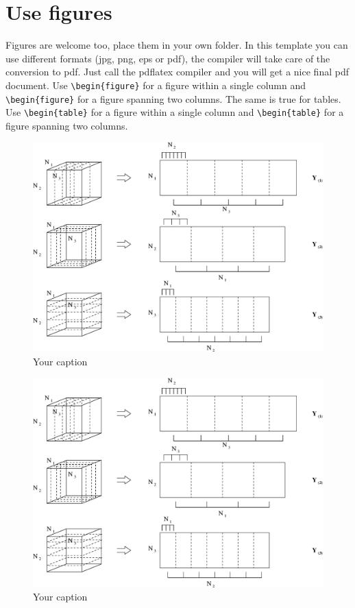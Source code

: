 \section{Use figures}

Figures are welcome too, place them in your own folder. In this template you can use different formats (jpg, png, eps or pdf), the compiler will take care of the conversion to pdf. Just call the pdflatex compiler and you will get a nice final pdf document. Use \verb"\begin{figure}" for a figure within a single column and \verb"\begin{figure}" for a figure spanning two columns.  The same is true for tables.  Use \verb"\begin{table}" for a figure within a single column and \verb"\begin{table}" for a figure spanning two columns.
%

%
\begin{figure}[htb]
\begin{center}
\includegraphics[width=0.7\linewidth,angle=0]{your_chapter_bibitem/fig1.eps}
\end{center}
\vspace{-4mm}
\caption{Your caption}
\label{fig:your_name_fig1}
\end{figure}
%

%
\begin{figure}[htb]
\begin{center}
\includegraphics[width=0.7\linewidth,angle=0]{your_chapter_bibitem/fig1.eps}
\end{center}
\vspace{-4mm}
\caption{Your caption}
\label{fig:your_name_fig2}
\end{figure}
%


